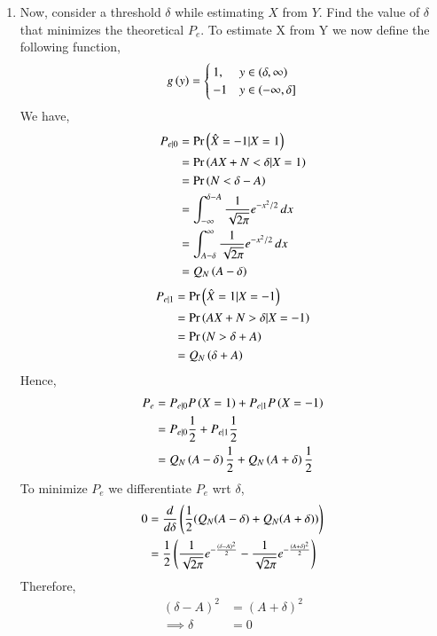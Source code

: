 \documentclass[journal,12pt,twocolumn]{IEEEtran}
\renewcommand\thesection{\arabic{section}}
\begin{document}
\begin{enumerate}[label=\thesection.\arabic*
,ref=\thesection.\theenumi]
\solution
\begin{figure}[!ht]
\texttt{[image: P\_err.png]}
\caption{$P_e vs A$}
\label{Fig:P_e}
\end{figure} 
%
\item Now, consider a threshold $\delta$  while estimating $X$ from $Y$. Find the value of $\delta$ that minimizes the theoretical $P_e$.
To estimate X from Y we now define the following function,
	\begin{align}  
g\left(y\right) = 
\begin{cases}
1, & y \in (\delta,\infty)\\
-1 & y \in (-\infty,\delta] \\
\end{cases}
\end{align}
We have,
\begin{align}
    P_{e|0} &= \Pr\left(\hat{X} = -1|X=1\right) \\
            &= \Pr\left(AX + N < \delta|X=1\right) \\    
            &= \Pr\left(N < \delta - A\right) \\
            &= \int_{-\infty}^{\delta - A} \frac{1}{\sqrt{2\pi}}e^{-x^2/2}\,dx  \\
            &= \int_{A - \delta}^{\infty} \frac{1}{\sqrt{2\pi}}e^{-x^2/2}\,dx  \\
            &= Q_{N}\left(A - \delta\right)
\end{align}
%
\begin{align}
    P_{e|1} &= \Pr\left(\hat{X} = 1|X=-1\right) \\
            &= \Pr\left(AX + N > \delta|X=-1\right) \\    
            &= \Pr\left(N > \delta + A\right) \\
            &= Q_{N}\left(\delta + A\right)
\end{align}
Hence,
\begin{align}
    P_e &= P_{e|0}P\left(X = 1\right) + P_{e|1}P\left(X = -1\right) \\
        &= P_{e|0}\frac{1}{2} + P_{e|1}\frac{1}{2} \\
        &= Q_{N}\left(A - \delta\right)\frac{1}{2} + Q_{N}\left(A + \delta\right)\frac{1}{2} 
\end{align}
To minimize $P_e$  we differentiate $P_e$ wrt $\delta$,
\begin{align}
0 &= \frac{d}{d\delta} \left(\frac{1}{2}(Q_N(A - \delta) + Q_N(A + \delta))\right) \\
&= \frac{1}{2} \left(\frac{1}{\sqrt{2\pi}} e^{-\frac{(\delta - A)^2}{2}} - \frac{1}{\sqrt{2\pi}} e^{-\frac{(A + \delta)^2}{2}} \right) \\
\end{align}
Therefore,
\begin{align}
    (\delta - A)^2 &= (A + \delta)^2 \\
    \implies \delta &= 0 
\end{align}


\end{enumerate}
\end{document}
